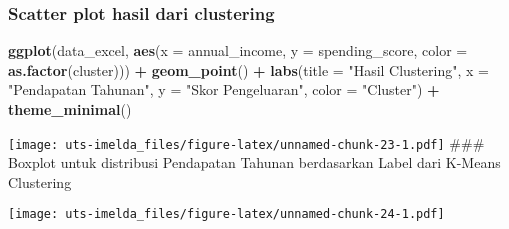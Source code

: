 \documentclass[
]{article}
\newenvironment{Shaded}{\begin{snugshade}}{\end{snugshade}}
\newcommand{\AttributeTok}[1]{\textcolor[rgb]{0.13,0.29,0.53}{#1}}
\newcommand{\CommentTok}[1]{\textcolor[rgb]{0.56,0.35,0.01}{\textit{#1}}}
\newcommand{\FunctionTok}[1]{\textcolor[rgb]{0.13,0.29,0.53}{\textbf{#1}}}
\newcommand{\NormalTok}[1]{#1}
\newcommand{\SpecialCharTok}[1]{\textcolor[rgb]{0.81,0.36,0.00}{\textbf{#1}}}
\newcommand{\StringTok}[1]{\textcolor[rgb]{0.31,0.60,0.02}{#1}}
\begin{document}
\hypertarget{scatter-plot-hasil-dari-clustering}{%
\subsubsection{Scatter plot hasil dari
clustering}\label{scatter-plot-hasil-dari-clustering}}

\begin{Shaded}
\begin{Highlighting}[]
\FunctionTok{ggplot}\NormalTok{(data\_excel, }\FunctionTok{aes}\NormalTok{(}\AttributeTok{x =}\NormalTok{ annual\_income, }\AttributeTok{y =}\NormalTok{ spending\_score, }\AttributeTok{color =} \FunctionTok{as.factor}\NormalTok{(cluster))) }\SpecialCharTok{+}
  \FunctionTok{geom\_point}\NormalTok{() }\SpecialCharTok{+}
  \FunctionTok{labs}\NormalTok{(}\AttributeTok{title =} \StringTok{"Hasil Clustering"}\NormalTok{, }\AttributeTok{x =} \StringTok{"Pendapatan Tahunan"}\NormalTok{, }\AttributeTok{y =} \StringTok{"Skor Pengeluaran"}\NormalTok{, }\AttributeTok{color =} \StringTok{"Cluster"}\NormalTok{) }\SpecialCharTok{+}
  \FunctionTok{theme\_minimal}\NormalTok{()}
\end{Highlighting}
\end{Shaded}

\texttt{[image: uts-imelda\_files/figure-latex/unnamed-chunk-23-1.pdf]}
\#\#\# Boxplot untuk distribusi Pendapatan Tahunan berdasarkan Label
dari K-Means Clustering

\begin{Shaded}
\end{Shaded}

\texttt{[image: uts-imelda\_files/figure-latex/unnamed-chunk-24-1.pdf]}
\end{document}
